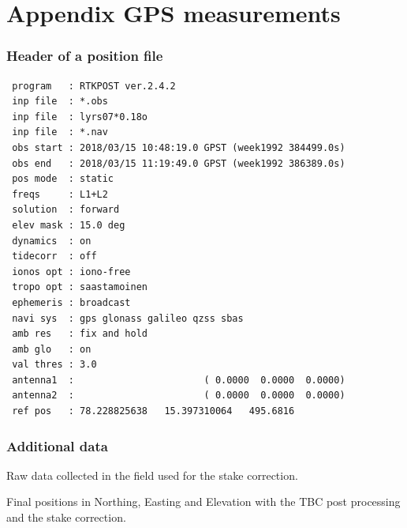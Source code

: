 

\chapter{Appendix GPS measurements}
\label{studentxx:appendix}

\subsection*{Header of a position file}
\begin{verbatim}
 program   : RTKPOST ver.2.4.2
 inp file  : *.obs
 inp file  : lyrs07*0.18o
 inp file  : *.nav
 obs start : 2018/03/15 10:48:19.0 GPST (week1992 384499.0s)
 obs end   : 2018/03/15 11:19:49.0 GPST (week1992 386389.0s)
 pos mode  : static
 freqs     : L1+L2
 solution  : forward
 elev mask : 15.0 deg
 dynamics  : on
 tidecorr  : off
 ionos opt : iono-free
 tropo opt : saastamoinen
 ephemeris : broadcast
 navi sys  : gps glonass galileo qzss sbas
 amb res   : fix and hold
 amb glo   : on
 val thres : 3.0
 antenna1  :                       ( 0.0000  0.0000  0.0000)
 antenna2  :                       ( 0.0000  0.0000  0.0000)
 ref pos   : 78.228825638   15.397310064   495.6816
\end{verbatim}

\subsection*{Additional data}

\begin{table}[h]
	\caption{Raw data collected in the field used for the stake correction.}
	\centering
	\begin{turn}{90}
		\scriptsize
		
		\label{GPS:tab:fb_other_tab}
	\end{turn}
\end{table}


\begin{table}[h]
	\caption{Final positions in Northing, Easting and Elevation with the TBC post processing and the stake correction.}
	\centering 
	
	\label{GPS:tab:tbc_tab}
\end{table}

